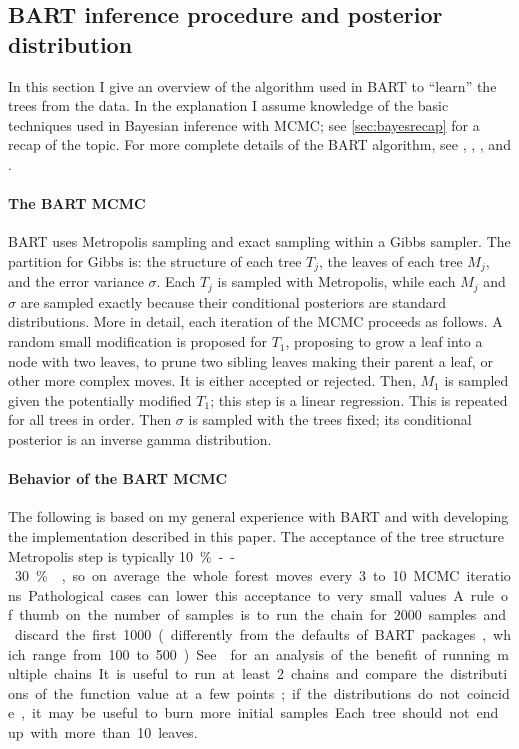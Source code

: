 \documentclass{article}
\begin{document}
    \subsection{BART inference procedure and posterior distribution}

    In this section I give an overview of the algorithm used in BART to ``learn'' the trees from the data. In the explanation I assume knowledge of the basic techniques used in Bayesian inference with MCMC; see \autoref{sec:bayesrecap} for a recap of the topic. For more complete details of the BART algorithm, see \citet{chipman1998,chipman2010}, \citet[\S A]{kapelner2016}, \citet[ch.~5]{daniels2023}, and \citet[\S2.1.4, p.~5]{tan2019}.

    \paragraph{The BART MCMC}

    BART uses Metropolis sampling and exact sampling within a Gibbs sampler. The partition for Gibbs is: the structure of each tree $T_j$, the leaves of each tree $M_j$, and the error variance $\sigma$. Each $T_j$ is sampled with Metropolis, while each $M_j$ and $\sigma$ are sampled exactly because their conditional posteriors are standard distributions. More in detail, each iteration of the MCMC proceeds as follows. A random small modification is proposed for $T_1$, proposing to grow a leaf into a node with two leaves, to prune two sibling leaves making their parent a leaf, or other more complex moves. It is either accepted or rejected. Then, $M_1$ is sampled given the potentially modified $T_1$; this step is a linear regression. This is repeated for all trees in order. Then $\sigma$ is sampled with the trees fixed; its conditional posterior is an inverse gamma distribution.

    \paragraph{Behavior of the BART MCMC}

    The following is based on my general experience with BART and with developing the implementation described in this paper. The acceptance of the tree structure Metropolis step is typically \SI{10}\%--\SI{30}\% \citep[see also][p.~891]{pratola2016}, so on average the whole forest moves every 3 to 10 MCMC iterations. Pathological cases can lower this acceptance to very small values. A rule of thumb on the number of samples is to run the chain for 2000 samples and discard the first 1000 (differently from the defaults of BART packages, which range from 100 to 500).
    See \citet[fig.~7, p.~20]{tan2024} for an analysis of the benefit of running multiple chains. It is useful to run at least 2 chains and compare the distributions of the function value at a few points; if the distributions do not coincide, it may be useful to burn more initial samples. Each tree should not end up with more than 10 leaves.
\end{document}
